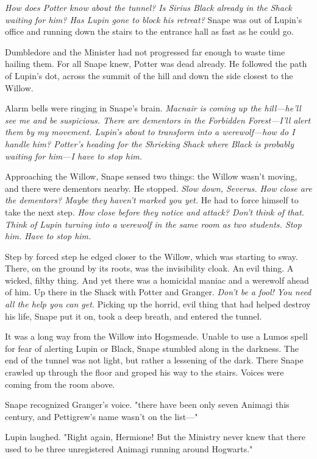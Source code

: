 \emph{How does Potter know about the tunnel? Is Sirius Black already in the Shack waiting for him? Has Lupin gone to block his retreat?} Snape was out of Lupin's office and running down the stairs to the entrance hall as fast as he could go.

Dumbledore and the Minister had not progressed far enough to waste time hailing them. For all Snape knew, Potter was dead already. He followed the path of Lupin's dot, across the summit of the hill and down the side closest to the Willow.

Alarm bells were ringing in Snape's brain. \emph{Macnair is coming up the hill—he'll see me and be suspicious. There are dementors in the Forbidden Forest—I'll alert them by my movement. Lupin's about to transform into a werewolf—how do I handle him? Potter's heading for the Shrieking Shack where Black is probably waiting for him—I have to stop him.}

Approaching the Willow, Snape sensed two things: the Willow wasn't moving, and there were dementors nearby. He stopped. \emph{Slow down, Severus. How close are the dementors? Maybe they haven't marked you yet.} He had to force himself to take the next step. \emph{How close before they notice and attack? Don't think of that. Think of Lupin turning into a werewolf in the same room as two students. Stop him. Have to stop him.}

Step by forced step he edged closer to the Willow, which was starting to sway. There, on the ground by its roots, was the invisibility cloak. An evil thing. A wicked, filthy thing. And yet there was a homicidal maniac and a werewolf ahead of him. Up there in the Shack with Potter and Granger. \emph{Don't be a fool! You need all the help you can get.} Picking up the horrid, evil thing that had helped destroy his life, Snape put it on, took a deep breath, and entered the tunnel.

It was a long way from the Willow into Hogsmeade. Unable to use a Lumos spell for fear of alerting Lupin or Black, Snape stumbled along in the darkness. The end of the tunnel was not light, but rather a lessening of the dark. There Snape crawled up through the floor and groped his way to the stairs. Voices were coming from the room above.

Snape recognized Granger's voice. "{\el}there have been only seven Animagi this century, and Pettigrew's name wasn't on the list—"

Lupin laughed. "Right again, Hermione! But the Ministry never knew that there used to be three unregistered Animagi running around Hogwarts."

